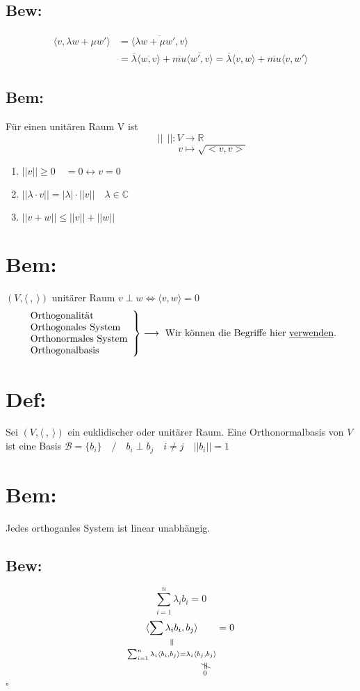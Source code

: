 \documentclass[titlepage,12pt,a4paper,ngerman]{report}
\newenvironment{bew}[1]{\subsection{Bew: #1}}{\hfill$\square$}
\newcommand{\Bew}[2]{\begin{bew}{#1}#2\end{bew}}
\newcommand{\verteq}{\rotatebox{90}{$\,=$}}
\newcommand{\equalto}[2]{\underset{\scriptstyle\overset{\mkern4mu\verteq}{#2}}{#1}}
\newcommand{\custo}[3]{\underset{\scriptstyle\overset{\mkern4mu\rotatebox{-90}{$\,#1$}}{#3}}{#2}}
\newcommand{\tx}[1]{\textrm{#1}}
\newcommand{\summ}[2]{\sum_{#1}^{#2}}
\begin{document}
\subsection{Bew:}
\begin{align*}
\langle v,\lambda w + \mu w'\rangle &= \langle \overline{\lambda w + \mu w', v} \rangle \\
&= \overline{\lambda} \langle \overline{w,v}\rangle + \overline{mu}\langle \overline{w',v}\rangle  = \overline{\lambda}\langle v,w \rangle + \overline{mu}\langle v,w'\rangle 
\end{align*}
\subsection{Bem:}
Für einen unitären Raum V ist
$$ || \ \ ||: V \to \mathbb{R}$$
$$ \qquad \qquad \qquad \ \ \, v \mapsto \sqrt{<v,v>}$$
\begin{enumerate}[1)]
	\item $ ||v|| \ge 0 \quad = 0 \leftrightarrow v = 0 $
	\item $ || \lambda \cdot v || = | \lambda| \cdot ||v|| \quad \lambda \in \mathbb{C} $
	\item $ ||v+w|| \le ||v|| + ||w|| $
\end{enumerate}

\section*{Bem:}
$(V, \langle\ ,\ \rangle)$ unitärer Raum $v \perp w \Leftrightarrow \langle v,w \rangle = 0$
$$\left. \begin{array}{l}
\tx{Orthogonalität} \\ \tx{Orthogonales System} \\ \tx{Orthonormales System} \\ \tx{Orthogonalbasis}
\end{array} \right  \} \longrightarrow \tx{ Wir können die Begriffe hier \underline{verwenden}.}$$
\section{Def:} Sei $ ( V, \langle\ ,\ \rangle)$ ein euklidischer oder unitärer Raum. Eine Orthonormalbasis von $V$ ist eine Basis $\mathcal B = \{b_i\}\quad /\quad b_i \perp b_j \quad i \neq j \quad ||b_i|| = 1$
\section*{Bem:} Jedes orthoganles System ist linear unabhängig.
\Bew{}{$$\summ{i=1}{n}\lambda_i b_i = 0$$
	$$\equalto{\langle \sum \lambda_i b_i, b_j\rangle}{\summ{i=1}{n}\lambda_i \langle b_i, b_j \rangle = \lambda_i \custo{\neq}{\langle b_j,b_j \rangle}{0}} = 0$$}
\end{document}
